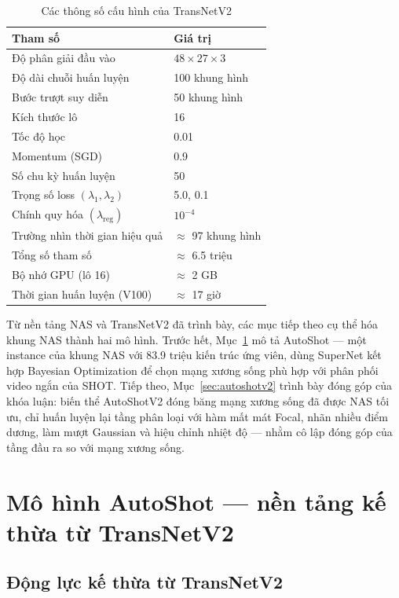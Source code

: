 \begin{table}[H]
\centering
\caption{Các thông số cấu hình của TransNetV2}
\label{tab:transnetv2_params}
\begin{tabularx}{\textwidth}{lY}
\toprule
\textbf{Tham số} & \textbf{Giá trị} \\
\midrule
Độ phân giải đầu vào & $48 \times 27 \times 3$ \\
Độ dài chuỗi huấn luyện & 100 khung hình \\
Bước trượt suy diễn & 50 khung hình \\
Kích thước lô & 16 \\
Tốc độ học & 0.01 \\
Momentum (SGD) & 0.9 \\
Số chu kỳ huấn luyện & 50 \\
Trọng số loss $(\lambda_1, \lambda_2)$ & 5.0, 0.1 \\
Chính quy hóa $(\lambda_{\mathrm{reg}})$ & $10^{-4}$ \\
Trường nhìn thời gian hiệu quả & $\approx$ 97 khung hình \\
Tổng số tham số & $\approx$ 6.5 triệu \\
Bộ nhớ GPU (lô 16) & $\approx$ 2 GB \\
Thời gian huấn luyện (V100) & $\approx$ 17 giờ \\
\bottomrule
\end{tabularx}
\end{table}

\noindent
Từ nền tảng NAS và TransNetV2 đã trình bày, các mục tiếp theo cụ thể hóa khung NAS thành hai mô hình. Trước hết, Mục~\ref{sec:autoshot} mô tả AutoShot --- một instance của khung NAS với 83.9 triệu kiến trúc ứng viên, dùng SuperNet kết hợp Bayesian Optimization để chọn mạng xương sống phù hợp với phân phối video ngắn của SHOT. Tiếp theo, Mục~\ref{sec:autoshotv2} trình bày đóng góp của khóa luận: biến thể AutoShotV2 đóng băng mạng xương sống đã được NAS tối ưu, chỉ huấn luyện lại tầng phân loại với hàm mất mát Focal, nhãn nhiều điểm dương, làm mượt Gaussian và hiệu chỉnh nhiệt độ --- nhằm cô lập đóng góp của tầng đầu ra so với mạng xương sống.

\section{Mô hình AutoShot — nền tảng kế thừa từ TransNetV2}
\label{sec:autoshot}

\subsection{Động lực kế thừa từ TransNetV2}
\label{subsec:autoshot_motivation}

